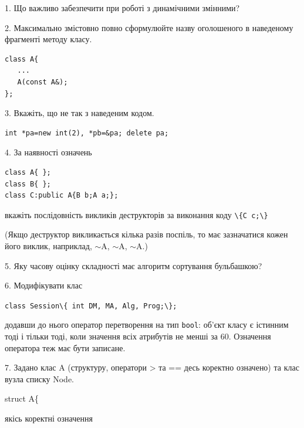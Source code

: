\documentclass[12pt, ukrainian]{article}
\def\code#1{\Verb!#1!}
\begin{document}
{%
1. Що важливо забезпечити при роботі з динамічними змінними?%
\par
\vspace{2mm}
2. Максимально змістовно повно сформулюйте назву оголошеного в наведеному фрагменті методу класу.
\vspace{-3mm}
\begin{verbatim}class A{
   ...
   A(const A&);
};\end{verbatim}
\vspace{-3mm}
\par
\vspace{2mm}
3. Вкажіть, що не так з наведеним кодом.
\vspace{-3mm}
\begin{verbatim}int *pa=new int(2), *pb=&pa; delete pa;\end{verbatim}
\vspace{-3mm}
\par
\vspace{2mm}
4. За наявності означень
\vspace{-3mm}
\begin{verbatim}
class A{ };
class B{ };
class C:public A{B b;A a;};\end{verbatim}
\vspace{-3mm}
вкажіть послідовність викликів деструкторів за виконання коду \code{\{C c;\}} 

(Якщо деструктор викликається кілька разів поспіль, то має зазначатися кожен його виклик, наприклад, $\sim$A, $\sim$A, $\sim$A.)

\vspace{2mm}
5. Яку часову оцінку складності має алгоритм сортування бульбашкою?
\par
\vspace{2mm}
6. Модифікувати клас 

\qquad\code{class Session\{ int DM, MA, Alg, Prog;\};} 


додавши до нього оператор перетворення на тип \code{bool}: об'єкт класу є істинним тоді і тільки тоді, коли значення всіх атрибутів не менші за 60. Означення оператора теж має бути записане.%
\par
\vspace{2mm}
7. 
Задано клас A (структуру, оператори > та == десь коректно означено) та клас вузла списку Node.

struct A\{

\quad  якісь коректні означення 

}
\end{document}
